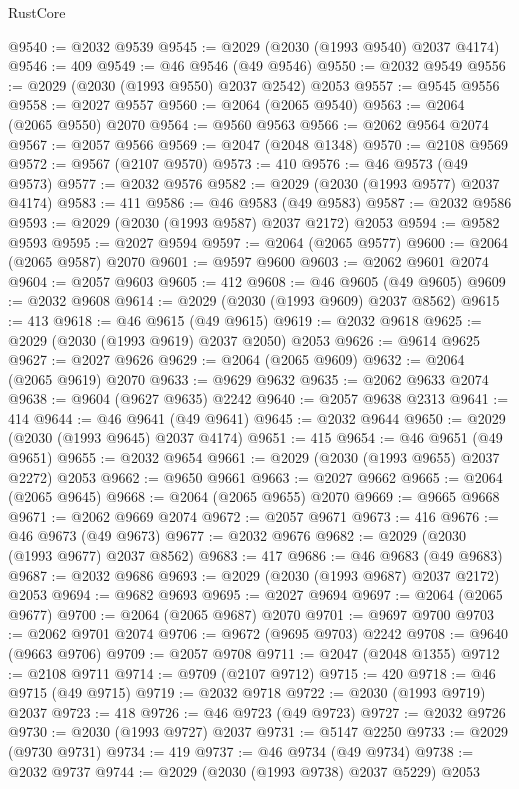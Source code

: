 \begin{lexlean}{RustCore}
\begin{coremodule}
@9540 := @2032 @9539
@9545 := @2029 (@2030 (@1993 @9540) @2037 @4174)
@9546 := 409
@9549 := @46 @9546 (@49 @9546)
@9550 := @2032 @9549
@9556 := @2029 (@2030 (@1993 @9550) @2037 @2542) @2053
@9557 := @9545 @9556
@9558 := @2027 @9557
@9560 := @2064 (@2065 @9540)
@9563 := @2064 (@2065 @9550) @2070
@9564 := @9560 @9563
@9566 := @2062 @9564 @2074
@9567 := @2057 @9566
@9569 := @2047 (@2048 @1348)
@9570 := @2108 @9569
@9572 := @9567 (@2107 @9570)
@9573 := 410
@9576 := @46 @9573 (@49 @9573)
@9577 := @2032 @9576
@9582 := @2029 (@2030 (@1993 @9577) @2037 @4174)
@9583 := 411
@9586 := @46 @9583 (@49 @9583)
@9587 := @2032 @9586
@9593 := @2029 (@2030 (@1993 @9587) @2037 @2172) @2053
@9594 := @9582 @9593
@9595 := @2027 @9594
@9597 := @2064 (@2065 @9577)
@9600 := @2064 (@2065 @9587) @2070
@9601 := @9597 @9600
@9603 := @2062 @9601 @2074
@9604 := @2057 @9603
@9605 := 412
@9608 := @46 @9605 (@49 @9605)
@9609 := @2032 @9608
@9614 := @2029 (@2030 (@1993 @9609) @2037 @8562)
@9615 := 413
@9618 := @46 @9615 (@49 @9615)
@9619 := @2032 @9618
@9625 := @2029 (@2030 (@1993 @9619) @2037 @2050) @2053
@9626 := @9614 @9625
@9627 := @2027 @9626
@9629 := @2064 (@2065 @9609)
@9632 := @2064 (@2065 @9619) @2070
@9633 := @9629 @9632
@9635 := @2062 @9633 @2074
@9638 := @9604 (@9627 @9635) @2242
@9640 := @2057 @9638 @2313
@9641 := 414
@9644 := @46 @9641 (@49 @9641)
@9645 := @2032 @9644
@9650 := @2029 (@2030 (@1993 @9645) @2037 @4174)
@9651 := 415
@9654 := @46 @9651 (@49 @9651)
@9655 := @2032 @9654
@9661 := @2029 (@2030 (@1993 @9655) @2037 @2272) @2053
@9662 := @9650 @9661
@9663 := @2027 @9662
@9665 := @2064 (@2065 @9645)
@9668 := @2064 (@2065 @9655) @2070
@9669 := @9665 @9668
@9671 := @2062 @9669 @2074
@9672 := @2057 @9671
@9673 := 416
@9676 := @46 @9673 (@49 @9673)
@9677 := @2032 @9676
@9682 := @2029 (@2030 (@1993 @9677) @2037 @8562)
@9683 := 417
@9686 := @46 @9683 (@49 @9683)
@9687 := @2032 @9686
@9693 := @2029 (@2030 (@1993 @9687) @2037 @2172) @2053
@9694 := @9682 @9693
@9695 := @2027 @9694
@9697 := @2064 (@2065 @9677)
@9700 := @2064 (@2065 @9687) @2070
@9701 := @9697 @9700
@9703 := @2062 @9701 @2074
@9706 := @9672 (@9695 @9703) @2242
@9708 := @9640 (@9663 @9706)
@9709 := @2057 @9708
@9711 := @2047 (@2048 @1355)
@9712 := @2108 @9711
@9714 := @9709 (@2107 @9712)
@9715 := 420
@9718 := @46 @9715 (@49 @9715)
@9719 := @2032 @9718
@9722 := @2030 (@1993 @9719) @2037
@9723 := 418
@9726 := @46 @9723 (@49 @9723)
@9727 := @2032 @9726
@9730 := @2030 (@1993 @9727) @2037
@9731 := @5147 @2250
@9733 := @2029 (@9730 @9731)
@9734 := 419
@9737 := @46 @9734 (@49 @9734)
@9738 := @2032 @9737
@9744 := @2029 (@2030 (@1993 @9738) @2037 @5229) @2053

\end{coremodule}
\end{lexlean}
